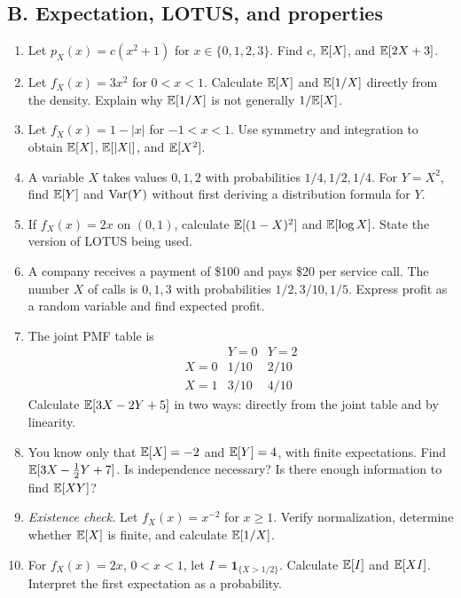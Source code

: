 \subsection{B. Expectation, LOTUS, and properties}
\begin{enumerate}[label=\textbf{B\arabic*.},leftmargin=*,itemsep=0.75em]
\item Let $p_X(x)=c(x^2+1)$ for $x\in\{0,1,2,3\}$. Find $c$, $\mathbb E[X]$, and $\mathbb E[2X+3]$.
\item Let $f_X(x)=3x^2$ for $0<x<1$. Calculate $\mathbb E[X]$ and $\mathbb E[1/X]$ directly from the density. Explain why $\mathbb E[1/X]$ is not generally $1/\mathbb E[X]$.
\item Let $f_X(x)=1-|x|$ for $-1<x<1$. Use symmetry and integration to obtain $\mathbb E[X]$, $\mathbb E[|X|]$, and $\mathbb E[X^2]$.
\item A variable $X$ takes values $0,1,2$ with probabilities $1/4,1/2,1/4$. For $Y=X^2$, find $\mathbb E[Y]$ and $\operatorname{Var}(Y)$ without first deriving a distribution formula for $Y$.
\item If $f_X(x)=2x$ on $(0,1)$, calculate $\mathbb E[(1-X)^2]$ and $\mathbb E[\log X]$. State the version of LOTUS being used.
\item A company receives a payment of \$100 and pays \$20 per service call. The number $X$ of calls is $0,1,3$ with probabilities $1/2,3/10,1/5$. Express profit as a random variable and find expected profit.
\item The joint PMF table is
\[
\begin{array}{c|cc}
 &Y=0&Y=2\\\hline
X=0&1/10&2/10\\
X=1&3/10&4/10
\end{array}
\]
Calculate $\mathbb E[3X-2Y+5]$ in two ways: directly from the joint table and by linearity.
\item You know only that $\mathbb E[X]=-2$ and $\mathbb E[Y]=4$, with finite expectations. Find $\mathbb E[3X-\tfrac12Y+7]$. Is independence necessary? Is there enough information to find $\mathbb E[XY]$?
\item \textit{Existence check.} Let $f_X(x)=x^{-2}$ for $x\geq1$. Verify normalization, determine whether $\mathbb E[X]$ is finite, and calculate $\mathbb E[1/X]$.
\item For $f_X(x)=2x$, $0<x<1$, let $I=\mathbf1_{\{X>1/2\}}$. Calculate $\mathbb E[I]$ and $\mathbb E[XI]$. Interpret the first expectation as a probability.
\end{enumerate}


